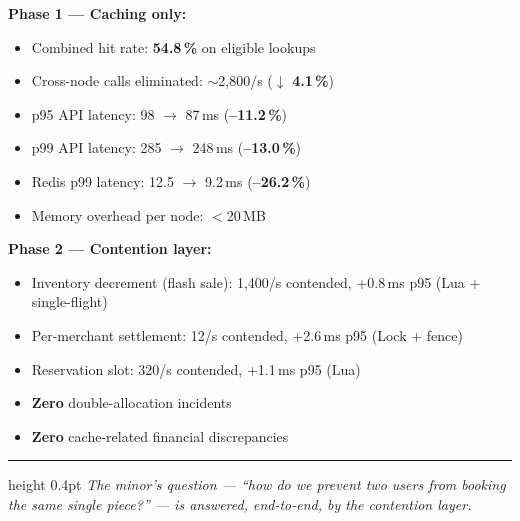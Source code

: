 \documentclass[9pt,a4paper]{extarticle}
\begin{document}
\begin{minipage}[t]{0.49\textwidth}
\vspace{0pt}
\small
\textbf{Phase 1 --- Caching only:}
\begin{itemize}[leftmargin=1.1em, itemsep=0pt, topsep=2pt]
  \item Combined hit rate: \textbf{54.8\,\%} on eligible lookups
  \item Cross-node calls eliminated: $\sim$2{,}800/s ($\downarrow$ \textbf{4.1\,\%})
  \item p95 API latency: 98 $\to$ 87\,ms (\textbf{--11.2\,\%})
  \item p99 API latency: 285 $\to$ 248\,ms (\textbf{--13.0\,\%})
  \item Redis p99 latency: 12.5 $\to$ 9.2\,ms (\textbf{--26.2\,\%})
  \item Memory overhead per node: $<$20\,MB
\end{itemize}
\end{minipage}\hfill
\begin{minipage}[t]{0.49\textwidth}
\vspace{0pt}
\small
\textbf{Phase 2 --- Contention layer:}
\begin{itemize}[leftmargin=1.1em, itemsep=0pt, topsep=2pt]
  \item Inventory decrement (flash sale): 1{,}400/s contended, +0.8\,ms p95 (Lua + single-flight)
  \item Per-merchant settlement: 12/s contended, +2.6\,ms p95 (Lock + fence)
  \item Reservation slot: 320/s contended, +1.1\,ms p95 (Lua)
  \item \textbf{Zero} double-allocation incidents
  \item \textbf{Zero} cache-related financial discrepancies
\end{itemize}
\end{minipage}

\vspace{4pt}
\hrule height 0.4pt
\vspace{2pt}
\centering\footnotesize\itshape
The minor's question --- ``how do we prevent two users from booking the same single piece?'' --- is answered, end-to-end, by the contention layer.
\end{document}
